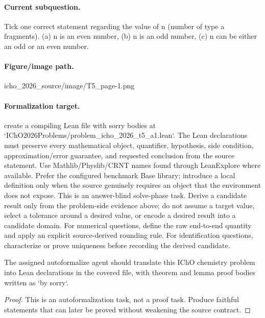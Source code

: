 \paragraph{Current subquestion.}
Tick one correct statement regarding the value of n (number of type a fragments). (a) n is an even number, (b) n is an odd number, (c) n can be either an odd or an even number.

\paragraph{Figure/image path.}
icho\_2026\_source/image/T5\_page-1.png

\paragraph{Formalization target.}
create a compiling Lean file with sorry bodies at `IChO2026Problems/problem\_icho\_2026\_t5\_a1.lean`.
The Lean declarations must preserve every mathematical object, quantifier, hypothesis, side condition, approximation/error guarantee, and requested conclusion from the source statement.
Use Mathlib/Physlib/CRNT names found through LeanExplore where available. Prefer the configured benchmark Base library; introduce a local definition only when the source genuinely requires an object that the environment does not expose.
This is an answer-blind solve-phase task. Derive a candidate result only from the problem-side evidence above; do not assume a target value, select a tolerance around a desired value, or encode a desired result into a candidate domain.
For numerical questions, define the raw end-to-end quantity and apply an explicit source-derived rounding rule. For identification questions, characterize or prove uniqueness before recording the derived candidate.

\begin{theorem}
\label{thm:physics:icho_2026_t5_a1:target}
The assigned autoformalize agent should translate this IChO chemistry problem into Lean declarations in the covered file, with theorem and lemma proof bodies written as `by sorry`.
\end{theorem}
\begin{proof}
This is an autoformalization task, not a proof task. Produce faithful statements that can later be proved without weakening the source contract.
\end{proof}
